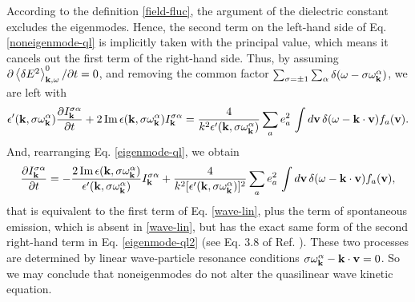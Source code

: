 \documentclass[12pt,a4paper,ruledheader]{report}
\begin{document}
According to the definition \eqref{field-fluc}, the argument
of the dielectric constant excludes the eigenmodes. Hence, the
second term on the left-hand side of Eq. \eqref{noneigenmode-ql}
is implicitly taken with the principal value, which means it
cancels out the first term of the right-hand side. Thus, by assuming
$\partial \left< \delta E^2 \right>_{{\bf k},\omega}^0/\partial t=0$,
and removing the common factor $\sum_{\sigma=\pm 1}\sum_\alpha
\delta(\omega-\sigma\omega_{\bf k}^\alpha)$, we are left with
\begin{equation}
  \label{eigenmode-ql}
  \begin{split}
    \epsilon '({\bf k},\sigma\omega_{\bf k}^\alpha)
    \frac{\partial I_{\bf k}^{\sigma \alpha}}{\partial t}
    +2\,\mbox{Im}\,\epsilon({\bf k},\sigma\omega_{\bf k}^\alpha)
    I_{\bf k}^{\sigma \alpha}
  =\frac{4}{k^2\epsilon '({\bf k},\sigma\omega_{\bf k}^\alpha)}
  \sum_a e^2_a\, \int d{\bf v}\,\delta(\omega-{\bf k \cdot v})f_a({\bf v}).
\end{split}
\end{equation}
And, rearranging Eq. \eqref{eigenmode-ql}, we obtain
\begin{equation}
  \begin{split}
\label{eigenmode-ql2}
    \frac{\partial I_{\bf k}^{\sigma \alpha}}{\partial t}
    =-\frac{2\,\mbox{Im}\,\epsilon({\bf k},\sigma\omega_{\bf k}^\alpha)}
    {\epsilon '({\bf k},\sigma\omega_{\bf k}^\alpha)}I_{\bf k}^{\sigma \alpha}
  +\frac{4}{k^2[\epsilon '({\bf k},\sigma\omega_{\bf k}^\alpha)]^2}
  \sum_a e^2_a\, \int d{\bf v}\,\delta(\omega-{\bf k \cdot v})f_a({\bf v}),
\end{split}
\end{equation}
that is equivalent to the first term of Eq. \eqref{wave-lin},
plus the term of spontaneous emission, which is absent in
\eqref{wave-lin}, but has the exact same form of the second
right-hand term in Eq. \eqref{eigenmode-ql2} (see Eq. 3.8 of
 Ref. \cite{YZKS16}). These two processes are determined by
 linear wave-particle resonance conditions
 $\sigma \omega_{\bf k}^\alpha-{\bf k\cdot v}=0$.
So we may conclude that noneigenmodes do not alter the
quasilinear wave kinetic equation.
\end{document}
